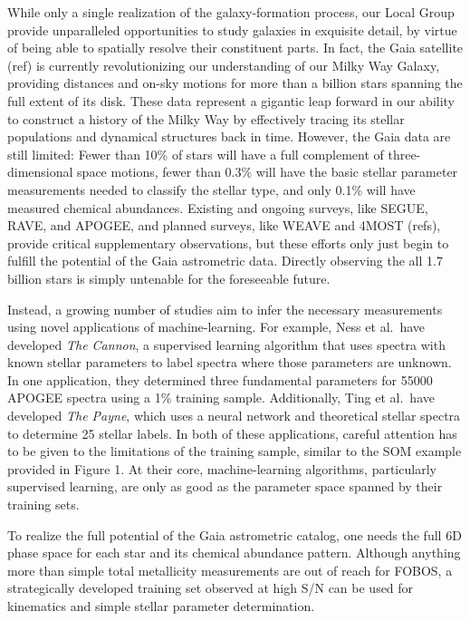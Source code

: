 \documentclass[oneside,11pt]{amsart}
\newcounter{chalno}
\newcommand{\chal}[1]{\refstepcounter{chalno}\label{#1}}
\begin{document}
While only a single realization of the galaxy-formation process, our
Local Group provide unparalleled opportunities to study galaxies in
exquisite detail, by virtue of being able to spatially resolve their
constituent parts.  In fact, the Gaia satellite (ref) is currently
revolutionizing our understanding of our Milky Way Galaxy, providing
distances and on-sky motions for more than a billion stars spanning the
full extent of its disk.  These data represent a gigantic leap forward
in our ability to construct a history of the Milky Way by effectively
tracing its stellar populations and dynamical structures back in time.
However, the Gaia data are still limited: Fewer than 10\% of stars will
have a full complement of three-dimensional space motions, fewer than
0.3\% will have the basic stellar parameter measurements needed to
classify the stellar type, and only 0.1\% will have measured chemical
abundances.  Existing and ongoing surveys, like SEGUE, RAVE, and APOGEE,
and planned surveys, like WEAVE and 4MOST (refs), provide critical
supplementary observations, but these efforts only just begin to fulfill
the potential of the Gaia astrometric data.  Directly observing the all
1.7 billion stars is simply untenable for the foreseeable future.

Instead, a growing number of studies aim to infer the necessary
measurements using novel applications of machine-learning.  For example,
Ness et al.\ have developed {\it The Cannon}, a supervised learning
algorithm that uses spectra with known stellar parameters to label
spectra where those parameters are unknown.  In one application, they
determined three fundamental parameters for 55000 APOGEE spectra using a
1\% training sample.  Additionally, Ting et al.\ have developed {\it The
Payne}, which uses a neural network and theoretical stellar spectra to
determine 25 stellar labels.  In both of these applications, careful
attention has to be given to the limitations of the training sample,
similar to the SOM example provided in Figure 1.  At their core,
machine-learning algorithms, particularly supervised learning, are only
as good as the parameter space spanned by their training sets.

\medskip \chal{gaia}   To
realize the full potential of the Gaia astrometric catalog, one needs
the full 6D phase space for each star and its chemical abundance
pattern.  Although anything more than simple total metallicity
measurements are out of reach for FOBOS, a strategically developed
training set observed at high S/N can be used for kinematics and simple
stellar parameter determination.
\end{document}
